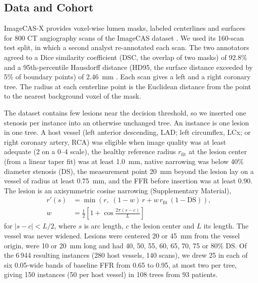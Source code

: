 \documentclass[journal]{IEEEtran}
\begin{document}
\subsection{Data and Cohort}
ImageCAS-X provides voxel-wise lumen masks, labeled centerlines and surfaces for 800 CT angiography scans of the
ImageCAS dataset \cite{zeng2023,bransby2026,imagecasx_data}. We used its 160-scan test split, in which a second
analyst re-annotated each scan. The two annotators agreed to a Dice similarity coefficient (DSC, the overlap of two
masks) of 92.8\% and a 95th-percentile Hausdorff distance (HD95, the surface distance exceeded by 5\% of boundary
points) of 2.46~mm \cite{bransby2026}. Each scan gives a left and a right coronary tree. The radius at each centerline point is the Euclidean distance from the point to
the nearest background voxel of the mask.

The dataset contains few lesions near the decision threshold, so we inserted one stenosis per instance into an
otherwise unchanged tree. An instance is one lesion in one tree. A host vessel (left anterior descending, LAD; left circumflex, LCx; or right coronary artery, RCA) was eligible
when image quality was at least adequate (2 on a 0--4 scale), the healthy reference radius $r_\mathrm{fit}$ at the
lesion center (from a linear taper fit) was at least 1.0~mm, native narrowing was below 40\% diameter stenosis (DS),
the measurement point 20~mm beyond the lesion lay on a vessel of radius at least 0.75~mm, and the FFR before
insertion was at least 0.90. The lesion is an axisymmetric cosine narrowing (Supplementary Material),
\begin{equation}
\begin{aligned}
r'(s) &= \min\!\left(r,\; (1-w)\,r + w\,r_\mathrm{fit}\,(1-\mathrm{DS})\right),\\
w &= \tfrac{1}{2}\left[1+\cos\tfrac{2\pi (s-c)}{L}\right]
\end{aligned}
\end{equation}
for $|s-c|<L/2$, where $s$ is arc length, $c$ the lesion center and $L$ its length. The vessel was never widened.
Lesions were centered 20 or 45~mm from the vessel origin, were 10 or 20~mm long and had 40, 50, 55, 60, 65, 70, 75
or 80\% DS. Of the 6\,944 resulting instances (280 host vessels, 140 scans), we drew 25 in each of six 0.05-wide bands of
baseline FFR from 0.65 to 0.95, at most two per tree, giving 150 instances (50 per host vessel) in 108 trees from 93
patients.
\end{document}

